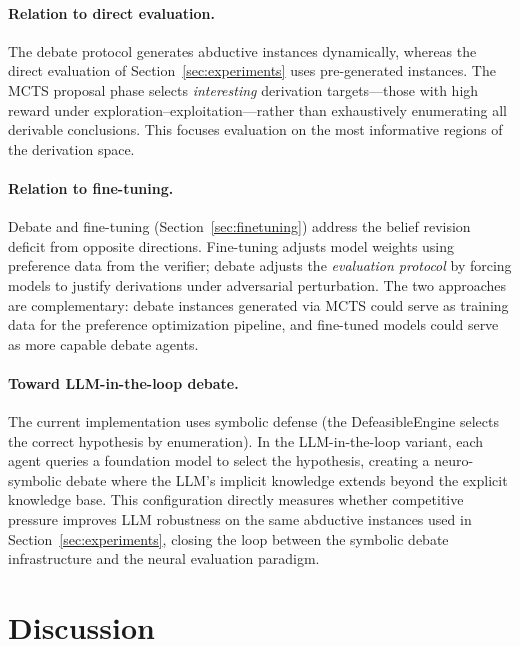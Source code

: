 \documentclass{article}
\theoremstyle{definition}
\begin{document}
\paragraph{Relation to direct evaluation.} The debate protocol generates abductive instances dynamically, whereas the direct evaluation of Section~\ref{sec:experiments} uses pre-generated instances. The MCTS proposal phase selects \emph{interesting} derivation targets---those with high reward under exploration--exploitation---rather than exhaustively enumerating all derivable conclusions. This focuses evaluation on the most informative regions of the derivation space.

\paragraph{Relation to fine-tuning.} Debate and fine-tuning (Section~\ref{sec:finetuning}) address the belief revision deficit from opposite directions. Fine-tuning adjusts model weights using preference data from the verifier; debate adjusts the \emph{evaluation protocol} by forcing models to justify derivations under adversarial perturbation. The two approaches are complementary: debate instances generated via MCTS could serve as training data for the preference optimization pipeline, and fine-tuned models could serve as more capable debate agents.

\paragraph{Toward LLM-in-the-loop debate.} The current implementation uses symbolic defense (the DefeasibleEngine selects the correct hypothesis by enumeration). In the LLM-in-the-loop variant, each agent queries a foundation model to select the hypothesis, creating a neuro-symbolic debate where the LLM's implicit knowledge extends beyond the explicit knowledge base. This configuration directly measures whether competitive pressure improves LLM robustness on the same abductive instances used in Section~\ref{sec:experiments}, closing the loop between the symbolic debate infrastructure and the neural evaluation paradigm.


\section{Discussion}\label{sec:discussion}
\end{document}
